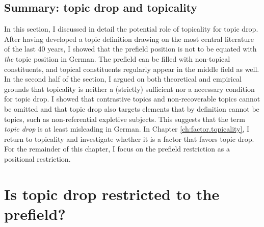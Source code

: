 \subsection{Summary: topic drop and topicality}
In this section, I discussed in detail the potential role of topicality for topic drop.
After having developed a topic definition drawing on the most central literature of the last 40 years, I showed that the prefield position is not to be equated with \textit{the} topic position in German.
The prefield can be filled with non-topical constituents, and topical constituents regularly appear in the middle field  as well.
In the second half of the section, I argued on both theoretical and empirical grounds that topicality is neither a (strictly) sufficient nor a necessary condition for topic drop.
I showed that contrastive topics  and non-recoverable topics cannot be omitted and that topic drop also targets elements that by definition cannot be topics, such as non-referential expletive  subjects.
This suggests that the term \textit{topic drop} is at least misleading in German.
In Chapter \ref{ch:factor.topicality}, I return to topicality and investigate whether it is a factor that favors topic drop.
For the remainder of this chapter, I focus on the prefield restriction as a positional restriction.

\section{Is topic drop restricted to the prefield?}\label{sec:prefield.detail}
